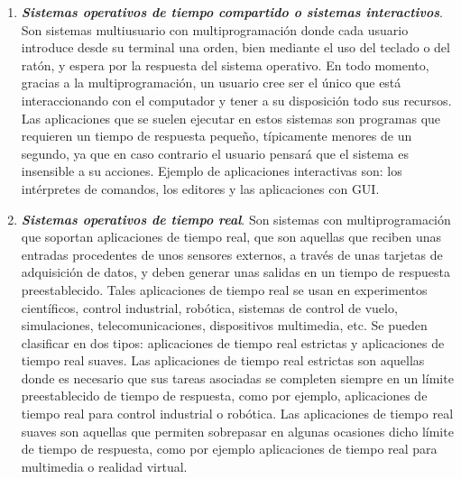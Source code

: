 \documentclass[12pt]{article}
\begin{document}
\begin{enumerate}
\begin{enumerate}
\item \textbf{\textit{Sistemas operativos de tiempo compartido o sistemas interactivos}}. Son sistemas multiusuario con
multiprogramación donde cada usuario introduce desde su terminal una orden, bien mediante el uso del teclado o del ratón, y espera por la respuesta del sistema operativo. En todo momento, gracias a la multiprogramación, un usuario cree ser el único que está interaccionando con el computador y tener a su disposición todo sus recursos. Las aplicaciones que se suelen ejecutar en estos sistemas son programas que requieren un tiempo de respuesta pequeño, típicamente menores de un segundo, ya que en caso contrario el usuario pensará que el sistema es insensible a su acciones. Ejemplo de aplicaciones interactivas son: los intérpretes de comandos, los editores y las aplicaciones con GUI.

\item \textbf{\textit{Sistemas operativos de tiempo real}}. Son sistemas con multiprogramación que soportan aplicaciones de tiempo real, que son aquellas que reciben unas entradas procedentes de unos sensores externos, a través de unas tarjetas de adquisición de datos, y deben generar unas salidas en un tiempo de respuesta preestablecido. Tales aplicaciones de tiempo real se usan en experimentos científicos, control industrial, robótica, sistemas de control de vuelo, simulaciones, telecomunicaciones, dispositivos multimedia, etc. Se pueden clasificar en dos tipos: aplicaciones de tiempo real estrictas y aplicaciones de tiempo real suaves. Las aplicaciones de tiempo real estrictas son aquellas donde es necesario que sus tareas asociadas se completen siempre en un límite preestablecido de tiempo de respuesta, como por ejemplo, aplicaciones de tiempo real para control industrial o robótica. Las aplicaciones de tiempo real suaves son aquellas que permiten sobrepasar en algunas
ocasiones dicho límite de tiempo de respuesta, como por ejemplo aplicaciones de tiempo real para multimedia o realidad virtual.


\end{enumerate}
\end{enumerate}
\end{document}
